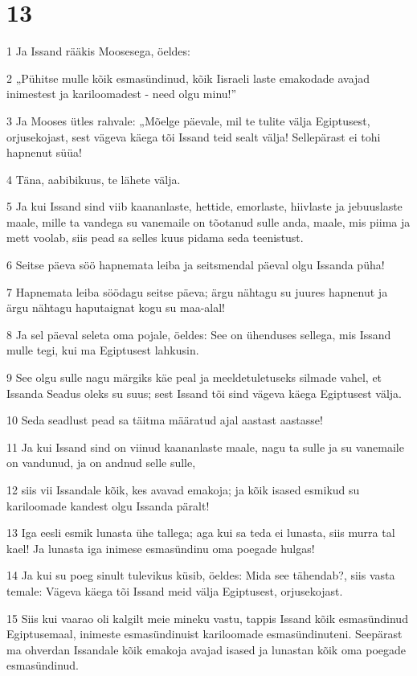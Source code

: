 \chapter{13}

\par 1 Ja Issand rääkis Moosesega, öeldes:
\par 2 „Pühitse mulle kõik esmasündinud, kõik Iisraeli laste emakodade avajad inimestest ja kariloomadest - need olgu minu!”
\par 3 Ja Mooses ütles rahvale: „Mõelge päevale, mil te tulite välja Egiptusest, orjusekojast, sest vägeva käega tõi Issand teid sealt välja! Sellepärast ei tohi hapnenut süüa!
\par 4 Täna, aabibikuus, te lähete välja.
\par 5 Ja kui Issand sind viib kaananlaste, hettide, emorlaste, hiivlaste ja jebuuslaste maale, mille ta vandega su vanemaile on tõotanud sulle anda, maale, mis piima ja mett voolab, siis pead sa selles kuus pidama seda teenistust.
\par 6 Seitse päeva söö hapnemata leiba ja seitsmendal päeval olgu Issanda püha!
\par 7 Hapnemata leiba söödagu seitse päeva; ärgu nähtagu su juures hapnenut ja ärgu nähtagu haputaignat kogu su maa-alal!
\par 8 Ja sel päeval seleta oma pojale, öeldes: See on ühenduses sellega, mis Issand mulle tegi, kui ma Egiptusest lahkusin.
\par 9 See olgu sulle nagu märgiks käe peal ja meeldetuletuseks silmade vahel, et Issanda Seadus oleks su suus; sest Issand tõi sind vägeva käega Egiptusest välja.
\par 10 Seda seadlust pead sa täitma määratud ajal aastast aastasse!
\par 11 Ja kui Issand sind on viinud kaananlaste maale, nagu ta sulle ja su vanemaile on vandunud, ja on andnud selle sulle,
\par 12 siis vii Issandale kõik, kes avavad emakoja; ja kõik isased esmikud su kariloomade kandest olgu Issanda päralt!
\par 13 Iga eesli esmik lunasta ühe tallega; aga kui sa teda ei lunasta, siis murra tal kael! Ja lunasta iga inimese esmasündinu oma poegade hulgas!
\par 14 Ja kui su poeg sinult tulevikus küsib, öeldes: Mida see tähendab?, siis vasta temale: Vägeva käega tõi Issand meid välja Egiptusest, orjusekojast.
\par 15 Siis kui vaarao oli kalgilt meie mineku vastu, tappis Issand kõik esmasündinud Egiptusemaal, inimeste esmasündinuist kariloomade esmasündinuteni. Seepärast ma ohverdan Issandale kõik emakoja avajad isased ja lunastan kõik oma poegade esmasündinud.
